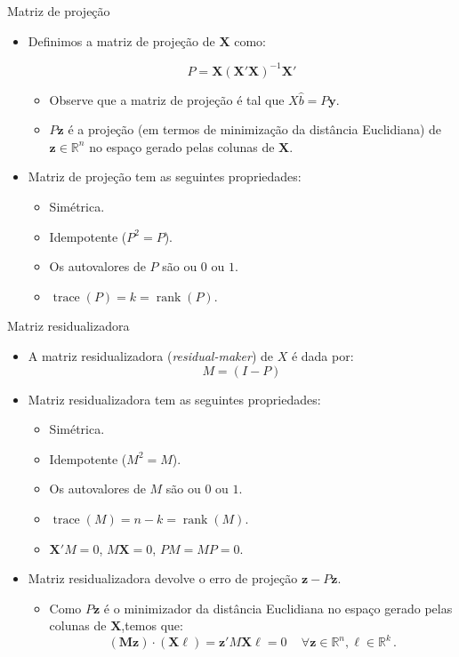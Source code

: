 \documentclass[11pt]{beamer}
\begin{document}
\begin{frame}{Matriz de projeção}
\begin{itemize}
	\item Definimos a matriz de projeção de $\boldsymbol{X}$ como:
	
	$$P = \boldsymbol{X}(\boldsymbol{X}'\boldsymbol{X})^{-1}\boldsymbol{X}'$$
	\begin{itemize}
		\item Observe que a matriz de projeção é tal que $X\hat{b} = P\boldsymbol{y}$.
		\item $P\boldsymbol{z}$ é a projeção (em termos de minimização da distância Euclidiana) de $\boldsymbol{z} \in \mathbb{R}^n$ no espaço gerado pelas colunas de $\boldsymbol{X}$.
	\end{itemize}
	\item Matriz de projeção tem as seguintes propriedades:
	\begin{itemize}
		\item Simétrica.
		\item Idempotente ($P^2=P$).
		\item Os autovalores de $P$ são ou $0$ ou $1$.
		\item $\operatorname{trace}(P) = k = \operatorname{rank}(P)$.
	\end{itemize}
\end{itemize}
\end{frame}
\begin{frame}{Matriz residualizadora}
	\begin{itemize}
		\item A matriz residualizadora (\textit{residual-maker}) de $X$ é dada por:
		$$M = (I-P)$$

		\item Matriz residualizadora tem as seguintes propriedades:
		\begin{itemize}
		\item Simétrica.
		\item Idempotente ($M^2=M$).
		\item Os autovalores de $M$ são ou $0$ ou $1$.
		\item $\operatorname{trace}(M) = n-k = \operatorname{rank}(M)$.
		\item $\boldsymbol{X}'M  = 0 $, $M\boldsymbol{X}=0$, $PM=MP=0$.
	\end{itemize}
	\item Matriz residualizadora devolve o erro de projeção $\boldsymbol{z} - {P}\boldsymbol{z}$.
	\begin{itemize}
		\item Como ${P}\boldsymbol{z}$ é o minimizador da distância Euclidiana no espaço gerado pelas colunas de $\boldsymbol{X}$,temos que: $$(\boldsymbol{M}\boldsymbol{z})\cdot(\boldsymbol{X}\boldsymbol{\ell}) = \boldsymbol{z}'M\boldsymbol{X}\boldsymbol{\ell} = 0\,\quad \forall \boldsymbol{z}\in \mathbb{R}^n, \boldsymbol{\ell} \in \mathbb{R}^k \, .$$
	\end{itemize}
\end{itemize}
\end{frame}
\end{document}

